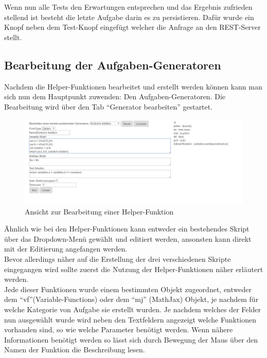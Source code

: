 Wenn nun alle Tests den Erwartungen entsprechen und das Ergebnis zufrieden stellend ist besteht die letzte Aufgabe darin es zu persistieren. Dafür wurde ein Knopf neben dem Test-Knopf eingefügt welcher die Anfrage an den REST-Server stellt. \\

\subsection{Bearbeitung der Aufgaben-Generatoren}

Nachdem die Helper-Funktionen bearbeitet und erstellt werden können kann man sich nun dem Hauptpunkt zuwenden: Den Aufgaben-Generatoren. Die Bearbeitung wird über den Tab ``Generator bearbeiten'' gestartet. \\

\begin{figure}[htp]     %
\centering
\includegraphics[width=1\textwidth]{bilder/EditScript} 
\caption[Ansicht zur Bearbeitung einer Helper-Funktion]{Ansicht zur Bearbeitung einer Helper-Funktion}
\end{figure} 

Ähnlich wie bei den Helper-Funktionen kann entweder ein bestehendes Skript über das Dropdown-Menü gewählt und editiert werden, ansonsten kann direkt mit der Editierung angefangen werden. \\

Bevor allerdings näher auf die Erstellung der drei verschiedenen Skripte eingegangen wird sollte zuerst die Nutzung der Helper-Funktionen näher erläutert werden. \\
Jede dieser Funktionen wurde einem bestimmten Objekt zugeordnet, entweder dem ``vf''(Variable-Functions) oder dem ``mj'' (MathJax) Objekt, je nachdem für welche Kategorie von Aufgabe sie erstellt wurden. Je nachdem welches der Felder nun ausgewählt wurde wird  neben den Textfeldern angezeigt welche Funktionen vorhanden sind, so wie welche Parameter benötigt werden. Wenn nähere Informationen benötigt werden so lässt sich durch Bewegung der Maus über den Namen der Funktion die Beschreibung lesen.\\

